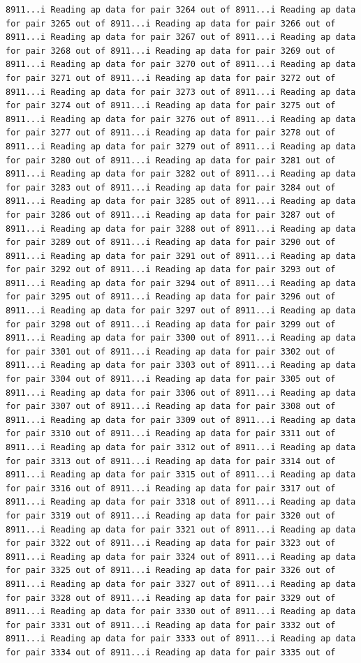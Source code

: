 \documentclass[
]{article}
\begin{document}
\begin{verbatim}
8911...i Reading ap data for pair 3264 out of 8911...i Reading ap data for pair 3265 out of 8911...i Reading ap data for pair 3266 out of 8911...i Reading ap data for pair 3267 out of 8911...i Reading ap data for pair 3268 out of 8911...i Reading ap data for pair 3269 out of 8911...i Reading ap data for pair 3270 out of 8911...i Reading ap data for pair 3271 out of 8911...i Reading ap data for pair 3272 out of 8911...i Reading ap data for pair 3273 out of 8911...i Reading ap data for pair 3274 out of 8911...i Reading ap data for pair 3275 out of 8911...i Reading ap data for pair 3276 out of 8911...i Reading ap data for pair 3277 out of 8911...i Reading ap data for pair 3278 out of 8911...i Reading ap data for pair 3279 out of 8911...i Reading ap data for pair 3280 out of 8911...i Reading ap data for pair 3281 out of 8911...i Reading ap data for pair 3282 out of 8911...i Reading ap data for pair 3283 out of 8911...i Reading ap data for pair 3284 out of 8911...i Reading ap data for pair 3285 out of 8911...i Reading ap data for pair 3286 out of 8911...i Reading ap data for pair 3287 out of 8911...i Reading ap data for pair 3288 out of 8911...i Reading ap data for pair 3289 out of 8911...i Reading ap data for pair 3290 out of 8911...i Reading ap data for pair 3291 out of 8911...i Reading ap data for pair 3292 out of 8911...i Reading ap data for pair 3293 out of 8911...i Reading ap data for pair 3294 out of 8911...i Reading ap data for pair 3295 out of 8911...i Reading ap data for pair 3296 out of 8911...i Reading ap data for pair 3297 out of 8911...i Reading ap data for pair 3298 out of 8911...i Reading ap data for pair 3299 out of 8911...i Reading ap data for pair 3300 out of 8911...i Reading ap data for pair 3301 out of 8911...i Reading ap data for pair 3302 out of 8911...i Reading ap data for pair 3303 out of 8911...i Reading ap data for pair 3304 out of 8911...i Reading ap data for pair 3305 out of 8911...i Reading ap data for pair 3306 out of 8911...i Reading ap data for pair 3307 out of 8911...i Reading ap data for pair 3308 out of 8911...i Reading ap data for pair 3309 out of 8911...i Reading ap data for pair 3310 out of 8911...i Reading ap data for pair 3311 out of 8911...i Reading ap data for pair 3312 out of 8911...i Reading ap data for pair 3313 out of 8911...i Reading ap data for pair 3314 out of 8911...i Reading ap data for pair 3315 out of 8911...i Reading ap data for pair 3316 out of 8911...i Reading ap data for pair 3317 out of 8911...i Reading ap data for pair 3318 out of 8911...i Reading ap data for pair 3319 out of 8911...i Reading ap data for pair 3320 out of 8911...i Reading ap data for pair 3321 out of 8911...i Reading ap data for pair 3322 out of 8911...i Reading ap data for pair 3323 out of 8911...i Reading ap data for pair 3324 out of 8911...i Reading ap data for pair 3325 out of 8911...i Reading ap data for pair 3326 out of 8911...i Reading ap data for pair 3327 out of 8911...i Reading ap data for pair 3328 out of 8911...i Reading ap data for pair 3329 out of 8911...i Reading ap data for pair 3330 out of 8911...i Reading ap data for pair 3331 out of 8911...i Reading ap data for pair 3332 out of 8911...i Reading ap data for pair 3333 out of 8911...i Reading ap data for pair 3334 out of 8911...i Reading ap data for pair 3335 out of 
\end{verbatim}
\end{document}

